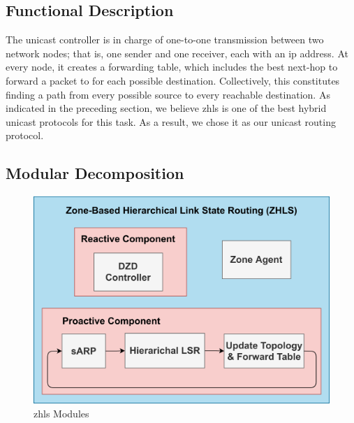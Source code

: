 \subsection{Functional Description}
The unicast controller is in charge of one-to-one transmission between two network nodes; that is, one sender and one receiver, each with an \acrshort{ip} address. At every node, it creates a forwarding table, which includes the best next-hop to forward a packet to for each possible destination. Collectively, this constitutes finding a path from every possible source to every reachable destination. As indicated in the preceding section, we believe \acrfull{zhls} is one of the best hybrid unicast protocols for this task. As a result, we chose it as our unicast routing protocol.

\subsection{Modular Decomposition}

\begin{figure}[!htb]
    \centering
    \includegraphics[width=\linewidth]{images/zhls-modules.png}
    \caption{\acrshort{zhls} Modules}
    \label{fig:zhls-modules}
\end{figure}

